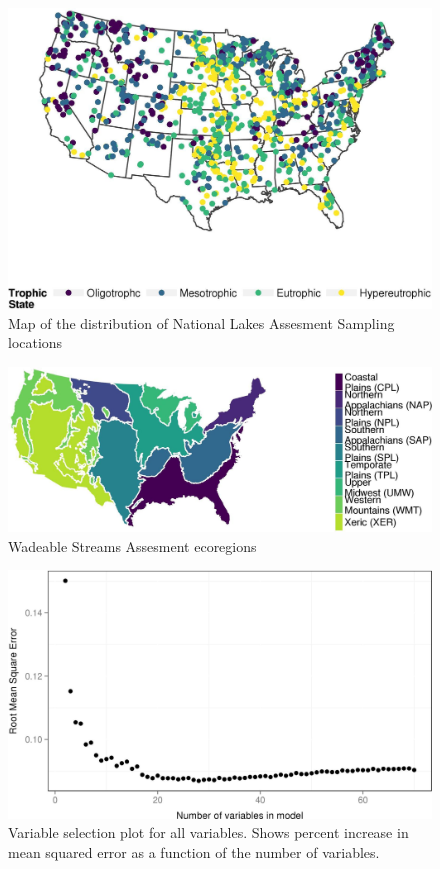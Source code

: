 \documentclass[12pt,]{article}
\begin{document}
\begin{figure}[htbp]
\centering
\includegraphics{manuscript_files/figure-latex/fig1_nlaMap-1.jpeg}
\caption{Map of the distribution of National Lakes Assesment Sampling
locations \label{fig:nlaMap}}
\end{figure}

\newpage

\begin{figure}[htbp]
\centering
\includegraphics{manuscript_files/figure-latex/ecoregion_map-1.jpeg}
\caption{Wadeable Streams Assesment ecoregions
\label{fig:ecoregion_map}}
\end{figure}

\newpage

\begin{figure}[htbp]
\centering
\includegraphics{manuscript_files/figure-latex/all_var_sel_figure-1.jpeg}
\caption{Variable selection plot for all variables. Shows percent
increase in mean squared error as a function of the number of variables.
\label{fig:all_varsel_figure}}
\end{figure}
\end{document}
